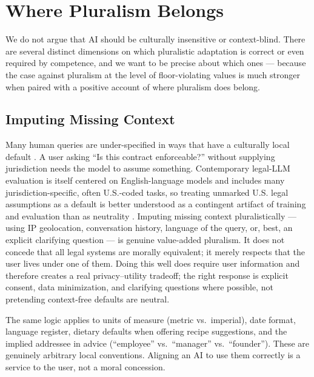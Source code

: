 \documentclass{article}
\theoremstyle{plain}
\theoremstyle{definition}
\theoremstyle{remark}
\begin{document}
\section{Where Pluralism Belongs}
\label{sec:pluralism}

We do not argue that AI should be culturally insensitive or context-blind. There are several distinct dimensions on which pluralistic adaptation is correct or even required by competence, and we want to be precise about which ones --- because the case against pluralism at the level of floor-violating values is much stronger when paired with a positive account of where pluralism does belong.

\subsection{Imputing Missing Context}
\label{sec:context}
Many human queries are under-specified in ways that have a culturally local default \citep{sorensen2024roadmap}. A user asking ``Is this contract enforceable?'' without supplying jurisdiction needs the model to assume something. Contemporary legal-LLM evaluation is itself centered on English-language models and includes many jurisdiction-specific, often U.S.-coded tasks, so treating unmarked U.S. legal assumptions as a default is better understood as a contingent artifact of training and evaluation than as neutrality \citep{guha2023legalbench, bender2021stochastic}. Imputing missing context pluralistically --- using IP geolocation, conversation history, language of the query, or, best, an explicit clarifying question \citep{askell2021general, kasirzadeh2023conversation} --- is genuine value-added pluralism. It does not concede that all legal systems are morally equivalent; it merely respects that the user lives under one of them. Doing this well does require user information and therefore creates a real privacy--utility tradeoff; the right response is explicit consent, data minimization, and clarifying questions where possible, not pretending context-free defaults are neutral.

The same logic applies to units of measure (metric vs.\ imperial), date format, language register, dietary defaults when offering recipe suggestions, and the implied addressee in advice (``employee'' vs.\ ``manager'' vs.\ ``founder''). These are genuinely arbitrary local conventions. Aligning an AI to use them correctly is a service to the user, not a moral concession.
\end{document}
